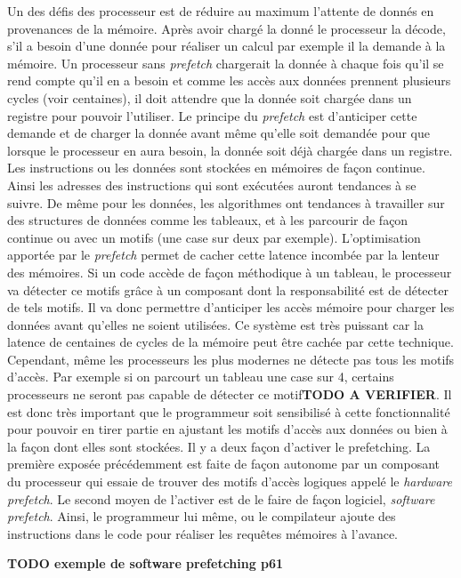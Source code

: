 Un des défis des processeur est de réduire au maximum l'attente de donnés en provenances de la mémoire. Après avoir chargé la donné le processeur la décode, s'il a besoin d'une donnée pour réaliser un calcul par exemple il la demande à la mémoire. Un processeur sans \textit{prefetch} chargerait la donnée à chaque fois qu'il se rend compte qu'il en a besoin et comme les accès aux données prennent plusieurs cycles (voir centaines), il doit attendre que la donnée soit chargée dans un registre pour pouvoir l'utiliser. Le principe du \textit{prefetch} est d'anticiper cette demande et de charger la donnée avant même qu'elle soit demandée pour que lorsque le processeur en aura besoin, la donnée soit déjà chargée dans un registre.
Les instructions ou les données sont stockées en mémoires de façon continue. Ainsi les adresses des instructions qui sont exécutées auront tendances à se suivre. De même pour les données, les algorithmes ont tendances à travailler sur des structures de données comme les tableaux, et à les parcourir de façon continue ou avec un motifs (une case sur deux par exemple). L'optimisation apportée par le \textit{prefetch} permet de cacher cette latence incombée par la lenteur des mémoires. Si un code accède de façon méthodique à un tableau, le processeur va détecter ce motifs grâce à un composant dont la responsabilité est de détecter de tels motifs. Il va donc permettre d'anticiper les accès mémoire pour charger les données avant qu'elles ne soient utilisées. Ce système est très puissant car la latence de centaines de cycles de la mémoire peut être cachée par cette technique. Cependant, même les processeurs les plus modernes ne détecte pas tous les motifs d'accès. Par exemple si on parcourt un tableau une case sur 4, certains processeurs ne seront pas capable de détecter ce motif\textbf{TODO A VERIFIER}. Il est donc très important que le programmeur soit sensibilisé à cette fonctionnalité pour pouvoir en tirer partie en ajustant les motifs d'accès aux données ou bien à la façon dont elles sont stockées.
Il y a deux façon d'activer le prefetching. La première exposée précédemment est faite de façon autonome par un composant du processeur qui essaie de trouver des motifs d'accès logiques appelé le \textit{hardware prefetch}. Le second moyen de l'activer est de le faire de façon logiciel, \textit{software prefetch}. Ainsi, le programmeur lui même, ou le compilateur ajoute des instructions dans le code pour réaliser les requêtes mémoires à l'avance.

\textbf{TODO exemple de software prefetching p61}

